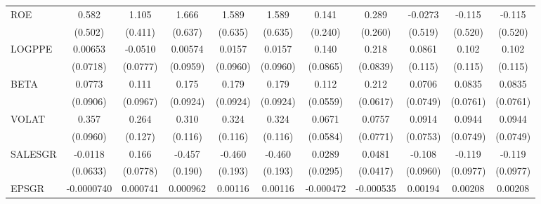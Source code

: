 \begin{table}[htbp]
\begin{tabular}{l*{10}{c}}
ROE             &    0.582         &    1.105\sym{***}&    1.666\sym{**} &    1.589\sym{**} &    1.589\sym{**} &    0.141         &    0.289         &  -0.0273         &   -0.115         &   -0.115         \\
                &  (0.502)         &  (0.411)         &  (0.637)         &  (0.635)         &  (0.635)         &  (0.240)         &  (0.260)         &  (0.519)         &  (0.520)         &  (0.520)         \\
LOGPPE          &  0.00653         &  -0.0510         &  0.00574         &   0.0157         &   0.0157         &    0.140         &    0.218\sym{**} &   0.0861         &    0.102         &    0.102         \\
                & (0.0718)         & (0.0777)         & (0.0959)         & (0.0960)         & (0.0960)         & (0.0865)         & (0.0839)         &  (0.115)         &  (0.115)         &  (0.115)         \\
BETA            &   0.0773         &    0.111         &    0.175\sym{*}  &    0.179\sym{*}  &    0.179\sym{*}  &    0.112\sym{*}  &    0.212\sym{***}&   0.0706         &   0.0835         &   0.0835         \\
                & (0.0906)         & (0.0967)         & (0.0924)         & (0.0924)         & (0.0924)         & (0.0559)         & (0.0617)         & (0.0749)         & (0.0761)         & (0.0761)         \\
VOLAT           &    0.357\sym{***}&    0.264\sym{**} &    0.310\sym{**} &    0.324\sym{***}&    0.324\sym{***}&   0.0671         &   0.0757         &   0.0914         &   0.0944         &   0.0944         \\
                & (0.0960)         &  (0.127)         &  (0.116)         &  (0.116)         &  (0.116)         & (0.0584)         & (0.0771)         & (0.0753)         & (0.0749)         & (0.0749)         \\
SALESGR         &  -0.0118         &    0.166\sym{**} &   -0.457\sym{**} &   -0.460\sym{**} &   -0.460\sym{**} &   0.0289         &   0.0481         &   -0.108         &   -0.119         &   -0.119         \\
                & (0.0633)         & (0.0778)         &  (0.190)         &  (0.193)         &  (0.193)         & (0.0295)         & (0.0417)         & (0.0960)         & (0.0977)         & (0.0977)         \\
EPSGR           &-0.0000740         & 0.000741         & 0.000962         &  0.00116         &  0.00116         &-0.000472         &-0.000535         &  0.00194\sym{*}  &  0.00208\sym{*}  &  0.00208\sym{*}  \\

\end{tabular}
\end{table}
